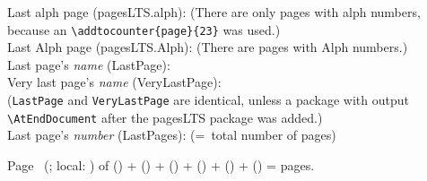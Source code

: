 \documentclass[british]{article}
\def\pagesLTSexamplealph{23}
\begin{document}
\noindent Last alph page (pagesLTS.alph): 
(There are only  pages with alph numbers,
because an \texttt{\textbackslash addtocounter\{page\}\{\pagesLTSexamplealph\}} was used.)\\

\noindent Last Alph page (pagesLTS.Alph): 
(There are  pages with Alph numbers.)\\

\noindent Last page's \textit{name} (LastPage): \\

\noindent Very last page's \textit{name} (VeryLastPage): \\
(\texttt{LastPage} and \texttt{VeryLastPage} are identical, unless
a package with output \linebreak
\texttt{\textbackslash AtEndDocument} after the \textsf{pagesLTS} package
was added.)\\

\noindent Last page's \textit{number} (LastPages): 
(=~total number of pages)\\

\medskip

\noindent Page \thepage\ (\theCurrentPage; local: \theCurrentPageLocal) of %
 () + %
 () + %
 () + %
 () + %
 () + %
 () = %
 pages.
\end{document}
